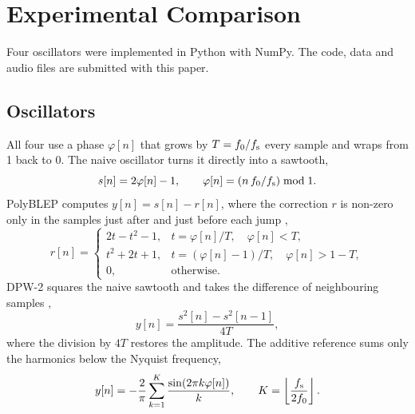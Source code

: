 \section{Experimental Comparison}\label{sec:contribution}

Four oscillators were implemented in Python with NumPy. The code, data
and audio files are submitted with this paper.

\subsection{Oscillators}\label{sec:oscillators}
All four use a phase $\varphi[n]$ that grows by $T = f_0/f_\mathrm{s}$ every
sample and wraps from 1 back to 0. The naive oscillator turns it directly
into a sawtooth,
\begin{equation}
  s[n] = 2\varphi[n] - 1, \qquad
  \varphi[n] = \left(n\,f_0/f_\mathrm{s}\right) \bmod 1 .
  \label{eq:naive}
\end{equation}
PolyBLEP computes $y[n] = s[n] - r[n]$, where the correction $r$ is
non-zero only in the samples just after and just before each jump
\cite{valimaki2007antialiasing},
\begin{equation}
  r[n] =
  \begin{cases}
    2t - t^2 - 1, & t = \varphi[n]/T, \quad \varphi[n] < T,\\
    t^2 + 2t + 1, & t = (\varphi[n]-1)/T, \quad \varphi[n] > 1-T,\\
    0,            & \text{otherwise}.
  \end{cases}
  \label{eq:polyblep}
\end{equation}
DPW-2 squares the naive sawtooth and takes the difference of neighbouring
samples \cite{valimaki2010dpw},
\begin{equation}
  y[n] = \frac{s^2[n] - s^2[n-1]}{4T},
  \label{eq:dpw}
\end{equation}
where the division by $4T$ restores the amplitude. The additive reference
sums only the harmonics below the Nyquist frequency,
\begin{equation}
  y[n] = -\frac{2}{\pi}\sum_{k=1}^{K}\frac{\sin(2\pi k\varphi[n])}{k},
  \qquad K = \left\lfloor \frac{f_\mathrm{s}}{2f_0} \right\rfloor .
  \label{eq:additive}
\end{equation}


